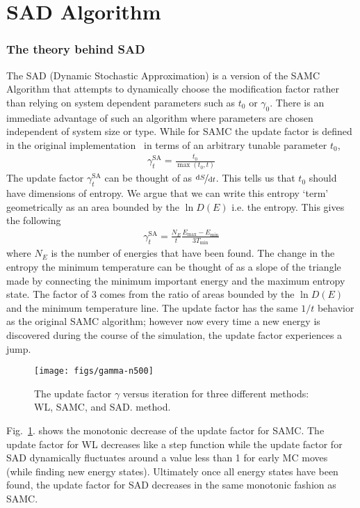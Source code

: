 \documentclass[letterpaper,twocolumn,amsmath,amssymb,pre,aps,10pt]{revtex4-1}
\begin{document}
\section{SAD Algorithm}
\subsubsection{The theory behind SAD}
The SAD (Dynamic Stochastic Approximation) is a version of the SAMC
Algorithm that attempts to dynamically choose the modification factor
rather than relying on system dependent parameters such as $t_0$ or
$\gamma_0$.  There is an immediate advantage of such an algorithm where
parameters are chosen independent of system size or type. While for
SAMC the update factor is defined in the original
implementation~\cite{liang2007stochastic} in terms of an arbitrary
tunable parameter $t_0$,
\begin{align}
\gamma_{t}^{\text{SA}} = \frac{t_0}{\max(t_0,t)}
\end{align}
The update factor $\gamma_{t}^{\text{SA}}$ can be thought of as
$\nicefrac{\text{d}S}{\text{d}t}$. This tells us that $t_0$ should have
dimensions of entropy.  We argue that we can write this entropy `term'
geometrically as an area bounded by the $\ln{D(E)}$ i.e. the entropy.  This
gives the following
\begin{align}
\gamma_{t}^{\text{SA}} =
\frac{N_E}{t}\frac{E_{\text{max}}-E_{\text{min}}}{3T_{\text{min}}}
\end{align}
where $N_E$ is the number of energies that have been found. The change
in the entropy the minimum temperature can be thought of as a slope of
the triangle made by connecting the minimum important energy and the
maximum entropy state.  The factor of $3$ comes from the ratio of areas bounded
by the $\ln{D(E)}$ and the minimum temperature line.
The update factor has the same $1/t$ behavior as the original SAMC algorithm; 
however now every time a new energy is discovered during the course 
of the simulation, the update factor experiences a jump.

\begin{figure}
  \texttt{[image: figs/gamma-n500]}
  \caption{The update factor $\gamma$ versus iteration for three
    different methods: WL, SAMC, and SAD.
    method.}\label{fig:gamma-vs-t}
\end{figure}

Fig.~\ref{fig:gamma-vs-t}. shows the monotonic decrease of the update
factor for SAMC.  The update factor for WL decreases like a step
function while the update factor for SAD dynamically fluctuates around
a value less than 1 for early MC moves (while finding new energy
states).  Ultimately once all energy states have been found, the update
factor for SAD decreases in the same monotonic fashion as SAMC.
\end{document}
